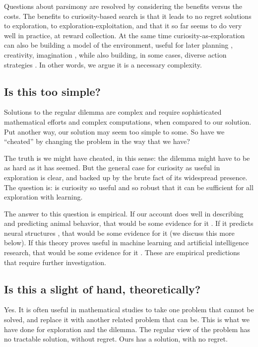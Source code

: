 Questions about parsimony are resolved by considering the benefits versus the costs. The benefits to curiosity-based search is that it leads to no regret solutions to exploration, to exploration-exploitation, and that it so far seems to do very well in practice, at reward collection. At the same time curiosity-as-exploration can also be building a model of the environment, useful for later planning \citep{Ahilan2019,Poucet1993}, creativity, imagination \citep{Schmidhuber2010}, while also building, in some cases, diverse action strategies \citep{Lehman2011a,Lehman2013,Mouret2015,Colas2020}. In other words, we argue it is a necessary complexity. 


\subsection*{Is this too simple?}
Solutions to the regular dilemma are complex and require sophisticated mathematical efforts and complex computations, when compared to our solution. Put another way, our solution may seem too simple to some. So have we ``cheated'' by changing the problem in the way that we have?

The truth is we might have cheated, in this sense: the dilemma might have to be as hard as it has seemed. But the general case for curiosity as useful in exploration is clear, and backed up by the brute fact of its widespread presence. The question is: is curiosity so useful and so robust that it can be sufficient for all exploration with learning. 

The answer to this question is empirical. If our account does well in describing and predicting animal behavior, that would be some evidence for it \citep{Sumner2019,Wang2019,Jaegle2019,Gottlieb2018,Kidd2015,Berlyne1950,Colas2020a,Rahnev2018,Wilson2020,CogliatiDezza2017b,Berger-Tal2014}. If it predicts neural structures \citep{Cisek2019,Kobayashi2019}, that would be some evidence for it (we discuss this more below). If this theory proves useful in machine learning and artificial intelligence research, that would be some evidence for it \citep{Burda2018,Schmidhuber1991,deAbril2018,Fister2019,Lehman2011a,Stanley2004a,Colas2020,Cully2015,Wilson2020,Pathak2019}. These are empirical predictions that require further investigation.


\subsection*{Is this a slight of hand, theoretically?}
Yes. It is often useful in mathematical studies to take one problem that cannot be solved, and replace it with another related problem that can be. This is what we have done for exploration and the dilemma. The regular view of the problem has no tractable solution, without regret. Ours has a solution, with no regret.


